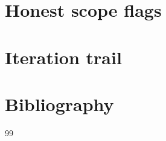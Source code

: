 \documentclass[11pt]{article}
\theoremstyle{definition}
\theoremstyle{plain}
\theoremstyle{remark}
\begin{document}
\section{Honest scope flags}

\section{Iteration trail}

\section*{Bibliography}
\begin{thebibliography}{99}
\end{thebibliography}
\end{document}
